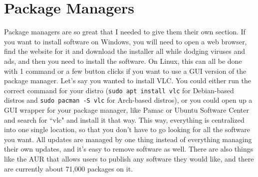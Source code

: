 \documentclass[12pt]{article}
\begin{document}
	\section{Package Managers}

	Package managers are so great that I needed to give them their own section. If you want to install software on Windows, you will need to open a web browser, find the website for it and download the installer all while dodging viruses and ads, and then you need to install the software. On Linux, this can all be done with 1 command or a few button clicks if you want to use a GUI version of the package manager. Let's say you wanted to install VLC. You could either run the correct command for your distro (\verb|sudo apt install vlc| for Debian-based distros and \verb|sudo pacman -S vlc| for Arch-based distros), or you could open up a GUI wrapper for your package manager, like Pamac or Ubuntu Software Center and search for ``vlc" and install it that way. This way, everything is centralized into one single location, so that you don't have to go looking for all the software you want. All updates are managed by one thing instead of everything managing their own updates, and it's easy to remove software as well. There are also things like the AUR that allows users to publish any software they would like, and there are currently about 71,000 packages on it. \cite{aur:0}

	\newpage
	
	
\end{document}
